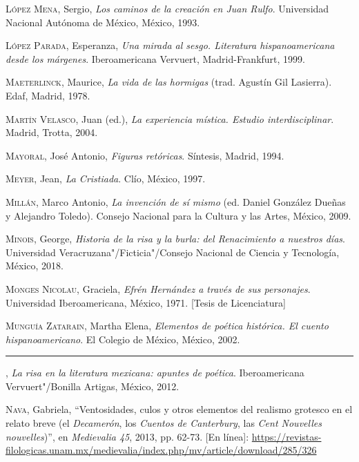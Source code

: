 \documentclass[14pt,twoside,final]{extbook} %
\begin{document}
\textsc{López Mena}, Sergio, \emph{Los caminos de la creación en Juan Rulfo}. Universidad Nacional Autónoma de México, México, 1993.\label{bib:lopezmena1993}

\textsc{López Parada}, Esperanza, \emph{Una mirada al sesgo. Literatura hispanoamericana desde los márgenes}. Iberoamericana Vervuert, Madrid-Frankfurt, 1999.\label{bib:lopezparada1999}

\textsc{Maeterlinck}, Maurice, \emph{La vida de las hormigas} (trad. Agustín Gil Lasierra). Edaf, Madrid, 1978.\label{bib:maeterlinck1978}

\textsc{Martín Velasco}, Juan (ed.), \emph{La experiencia mística. Estudio interdisciplinar}. Madrid, Trotta, 2004.\label{bib:martin2004}

\textsc{Mayoral}, José Antonio, \emph{Figuras retóricas}. Síntesis, Madrid, 1994.\label{bib:mayoral1994}

\textsc{Meyer}, Jean, \emph{La Cristiada}. Clío, México, 1997.\label{bib:meyer1997}

\textsc{Millán}, Marco Antonio, \emph{La invención de sí mismo} (ed. Daniel González Dueñas y Alejandro Toledo). Consejo Nacional para la Cultura y las Artes, México, 2009.\label{bib:millan2009}

\textsc{Minois}, George, \emph{Historia de la risa y la burla: del Renacimiento a nuestros días}. Universidad Veracruzana"/Ficticia"/Consejo Nacional de Ciencia y Tecnología, México, 2018.\label{bib:minois2018}

\textsc{Monges Nicolau}, Graciela, \emph{Efrén Hernández a través de sus personajes}. Universidad Iberoamericana, México, 1971. [Tesis de Licenciatura]\label{bib:monges1971}

\textsc{Munguía Zatarain}, Martha Elena, \emph{Elementos de poética histórica. El cuento hispanoamericano}. El Colegio de México, México, 2002.\label{bib:munguia2002}

\rule{1cm}{0.4pt}, \emph{La risa en la literatura mexicana: apuntes de poética}. Iberoamericana Vervuert"/Bonilla Artigas, México, 2012.\label{bib:munguia2012}

\textsc{Nava}, Gabriela, ``Ventosidades, culos y otros elementos del realismo grotesco en el relato breve (el \emph{Decamerón}, los \emph{Cuentos de Canterbury}, las \emph{Cent Nouvelles nouvelles})'', en \emph{Medievalia 45}, 2013, pp. 62-73. [En línea]: \url{https://revistas-filologicas.unam.mx/medievalia/index.php/mv/article/download/285/326}\label{bib:nava2013}
\end{document}
